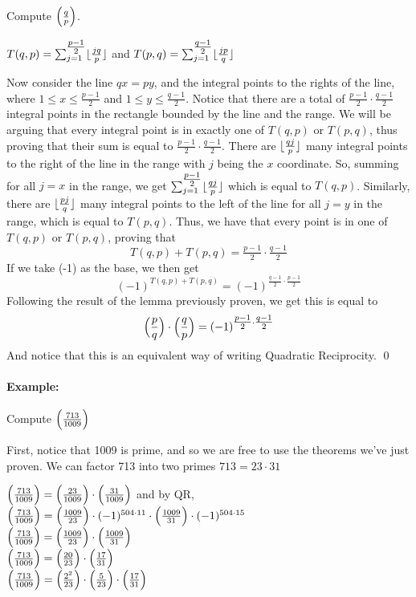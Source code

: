 \documentclass[../main.tex]{subfiles}
\begin{document}
\begin{pf}
    Compute $\Big(\frac{q}{p}\Big)$.
    \begin{center}
        $T(q,p)=\sum_{j=1}^{\tfrac{p-1}{2}} \lfloor\tfrac{jq}{p}\rfloor$ and $T(p,q)=\sum_{j=1}^{\tfrac{q-1}{2}} \lfloor\tfrac{jp}{q}\rfloor$
    \end{center}
    Now consider the line $qx=py$, and the integral points to the rights of  the line, where $1 \leq x \leq \tfrac{p-1}{2}$ and $1 \leq y \leq \tfrac{q-1}{2}$. Notice that there are a total of $\tfrac{p-1}{2}\cdot \tfrac{q-1}{2}$ integral points in the rectangle bounded by the line and the range. We will be arguing that every integral point is in exactly one of $T(q,p)$ or $T(p,q)$, thus proving that their sum is equal to $\tfrac{p-1}{2} \cdot \tfrac{q-1}{2}$. \sspace
    There are $\lfloor\tfrac{qj}{p}\rfloor$ many integral points to the right of the line in the range with $j$ being the $x$ coordinate. So, summing for all $j=x$ in the range, we get $\sum_{j=1}^{\tfrac{p-1}{2}}\lfloor\tfrac{qj}{p}\rfloor$ which is equal to $T(q,p)$. Similarly, there are $\lfloor\tfrac{pj}{q}\rfloor$ many integral points to the left of the line for all $j=y$ in the range, which is equal to $T(p,q)$. \sspace
    Thus, we have that every point is in one of $T(q,p)$ or $T(p,q)$, proving that $$T(q,p)+T(p,q)=\tfrac{p-1}{2} \cdot \tfrac{q-1}{2}$$ If we take (-1) as the base, we then get 
    $$(-1)^{T(q,p) + T(p,q)}=(-1)^{\tfrac{q-1}{2} \cdot \tfrac{p-1}{2}}$$ Following the result of the lemma previously proven, we get this is equal to
    $$\Big(\frac{p}{q}\Big)\cdot \Big(\frac{q}{p}\Big)=(-1)^{\tfrac{p-1}{2}\cdot \tfrac{q-1}{2}}$$ And notice that this is an equivalent way of writing Quadratic Reciprocity. \qed
\end{pf}

\paragraph{Example:} Compute $\Big(\frac{713}{1009}\Big)$
\begin{ans}
    First, notice that 1009 is prime, and so we are free to use the theorems we've just proven. We can factor 713 into two primes $713=23 \cdot 31$
    \begin{center}
        $\Big(\frac{713}{1009}\Big)=\Big(\frac{23}{1009}\Big)\cdot\Big(\frac{31}{1009}\Big)$ and by QR,\\
        $\Big(\frac{713}{1009}\Big)=\Big(\frac{1009}{23}\Big)\cdot(-1)^{504 \cdot 11} \cdot \Big(\frac{1009}{31}\Big) \cdot (-1)^{504 \cdot 15}$ \\
        $\Big(\frac{713}{1009}\Big)=\Big(\frac{1009}{23}\Big) \cdot \Big(\frac{1009}{31}\Big)$ \\
        $\Big(\frac{713}{1009}\Big)=\Big(\frac{20}{23}\Big) \cdot \Big(\frac{17}{31}\Big)$ \\
        $\Big(\frac{713}{1009}\Big)=\Big(\frac{2^2}{23}\Big)\cdot\Big(\frac{5}{23}\Big)\cdot\Big(\frac{17}{31}\Big)$
    \end{center}
\end{ans}
\end{document}

